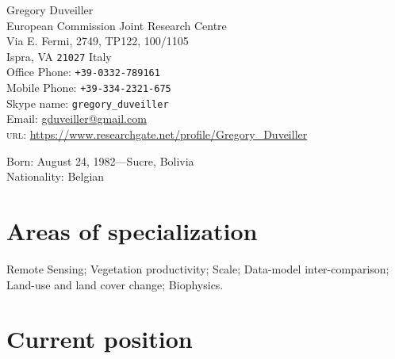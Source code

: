 \documentclass[11pt, a4paper]{article} %
\begin{document}

{\LARGE Gregory Duveiller}\\[1cm] %
European Commission Joint Research Centre\\ %
Via E. Fermi, 2749, TP122, 100/1105\\
Ispra, VA \texttt{21027}
Italy\\[.2cm]
Office Phone: \texttt{+39-0332-789161}\\
Mobile Phone: \texttt{+39-334-2321-675}\\ %
Skype name: \texttt{gregory\_duveiller}\\[.2cm] %
Email: \href{mailto:gduveiller@gmail.com}{gduveiller@gmail.com}\\ %
\textsc{url}: \href{https://www.researchgate.net/profile/Gregory_Duveiller}{https://www.researchgate.net/profile/Gregory\_Duveiller}\\ %

\vspace{3cm}


Born: August 24, 1982---Sucre, Bolivia\\ %
Nationality: Belgian\\ %
\section*{Areas of specialization}

Remote Sensing; Vegetation productivity; Scale; Data-model inter-comparison; Land-use and land cover change; Biophysics. %

\section*{Current position}
\end{document}
